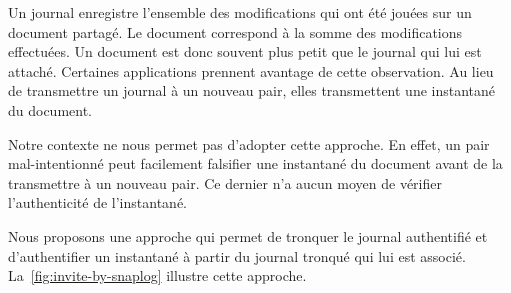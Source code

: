 Un journal enregistre l'ensemble des modifications qui ont été jouées sur un document partagé.
Le document correspond à la somme des modifications effectuées.
Un document est donc souvent plus petit que le journal qui lui est attaché.
Certaines applications prennent avantage de cette observation.
Au lieu de transmettre un journal à un nouveau pair, elles transmettent une instantané du document.

Notre contexte ne nous permet pas d'adopter cette approche.
En effet, un pair mal-intentionné peut facilement falsifier une instantané du document avant de la transmettre à un nouveau pair.
Ce dernier n'a aucun moyen de vérifier l'authenticité de l'instantané.

Nous proposons une approche qui permet de tronquer le journal authentifié et d'authentifier un instantané à partir du journal tronqué qui lui est associé.
La~\autoref{fig:invite-by-snaplog} illustre cette approche.

